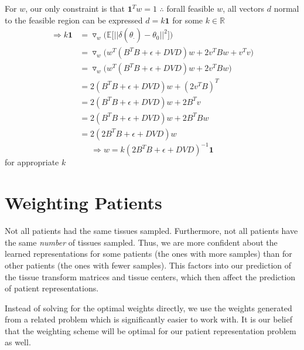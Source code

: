 \documentclass{article}
\begin{document}
For $w$, our only constraint is that $\mathbf{1}^Tw = 1$ $\therefore$ forall feasible $w$, all vectors $d$ normal to the feasible region can be expressed $d = k\mathbf{1}$ for some $k \in \mathbb{R}$ \\
\begin{align*}
\Rightarrow k \mathbf{1} &= \triangledown_w \bigg(\mathbb{E}\big[||\delta(\hat{\theta}_\cdot) - \theta_0||^2\big]\bigg)
\\&= \triangledown_w \Big(w^T(B^TB + \epsilon + DVD)w + 2v^TBw+ v^Tv\Big)
\\&= \triangledown_w \Big(w^T(B^TB + \epsilon + DVD)w + 2v^TBw\Big)
\\&= 2(B^TB + \epsilon + DVD)w + (2v^TB)^T
\\&= 2(B^TB + \epsilon + DVD)w + 2B^Tv
\\&= 2(B^TB + \epsilon + DVD)w + 2B^TBw
\\&= 2(2B^TB + \epsilon + DVD)w
\end{align*}
\[ \Rightarrow w = k(2B^TB + \epsilon + DVD)^{-1}\mathbf{1} \]
for appropriate $k$ \\



\section{Weighting Patients}
Not all patients had the same tissues sampled. Furthermore, not all patients have the same {\it number} of tissues sampled. Thus, we are more confident about the learned representations for some patients (the ones with more samples) than for other patients (the ones with fewer samples). This factors into our prediction of the tissue transform matrices and tissue centers, which then affect the prediction of patient representations.

Instead of solving for the optimal weights directly, we use the weights generated from a related problem which is significantly easier to work with. It is our belief that the weighting scheme will be optimal for our patient representation problem as well.
\end{document}
